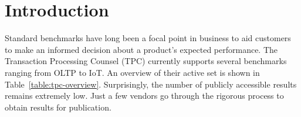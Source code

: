 \documentclass{cidr-2019}
\begin{document}
\maketitle

\section{Introduction}\label{Introduction}


Standard benchmarks have long been a focal point in business to aid
customers to make an informed decision about a product's expected
performance. The Transaction Processing Counsel (TPC) currently supports
several benchmarks ranging from OLTP to IoT. An overview of their
active set is shown in Table~\ref{table:tpc-overview}. Surprisingly,
the number of publicly accessible results remains extremely low. Just
a few vendors go through the rigorous process to obtain results for
publication.

\end{document}
